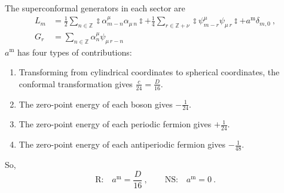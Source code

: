 	The superconformal generators in each sector are
	\begin{subequations}
		\begin{align}
			L_{m}&=\frac{1}{2}\sum_{n\in\mathds{Z}}\typecolon \alpha_{m-n}^{\mu}\alpha_{\mu\,n}\!\typecolon
			+\frac{1}{4}\sum_{r\in\mathds{Z}+\nu}\typecolon\psi^{\mu}_{m-r}\psi_{\mu\,r}\!\typecolon+a^{\mathrm{m}}\delta_{m,0}\:, \label{10.2.12a} \\
			G_{r}&=\sum_{n\in\mathds{Z}}\alpha_{n}^{\mu}\psi_{\mu\,r-n} \label{10.2.12b}
		\end{align}
	\end{subequations}
	$a^{\mathrm{m}}$ has four types of contributions:
	\begin{enumerate}
		\item Transforming from cylindrical coordinates to spherical coordinates, the conformal transformation gives $\frac{c}{24}=\frac{D}{16}$.
		\item The zero-point energy of each boson gives $-\frac{1}{24}$.
		\item The zero-point energy of each periodic fermion gives $+\frac{1}{24}$.
		\item The zero-point energy of each antiperiodic fermion gives $-\frac{1}{48}$.
	\end{enumerate}
	So,
	\begin{equation}
		\text{R:}\quad a^{\mathrm{m}}=\frac{D}{16}\:,\qquad
		\text{NS:}\quad a^{\mathrm{m}}=0 \:. \label{10.2.13}
	\end{equation}

